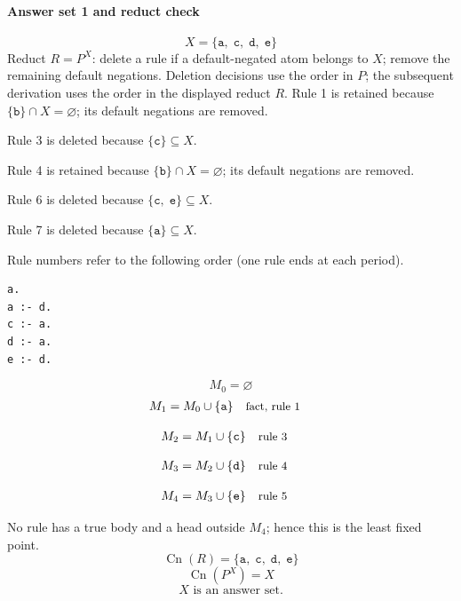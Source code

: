 \documentclass[a4paper,11pt]{article}
\newif\ifexplain
\newcommand{\explain}[1]{\ifexplain\begin{erklbox}#1\end{erklbox}\fi}
\newcommand{\why}[1]{\text{\small #1}}
\newcommand{\at}[1]{\texttt{#1}}
\begin{document}
\paragraph{Answer set 1 and reduct check}
\[
X=\{\at{a},\;\at{c},\;\at{d},\;\at{e}\}
\]
Reduct $R=P^X$: delete a rule if a default-negated atom belongs to $X$; remove the remaining default negations. Deletion decisions use the order in $P$; the subsequent derivation uses the order in the displayed reduct $R$.
Rule 1 is retained because $\{\at{b}\}\cap X=\varnothing$; its default negations are removed.

Rule 3 is deleted because $\{\at{c}\}\subseteq X$.

Rule 4 is retained because $\{\at{b}\}\cap X=\varnothing$; its default negations are removed.

Rule 6 is deleted because $\{\at{c},\;\at{e}\}\subseteq X$.

Rule 7 is deleted because $\{\at{a}\}\subseteq X$.

Rule numbers refer to the following order (one rule ends at each period).
\begin{small}
\begin{verbatim}
a.
a :- d.
c :- a.
d :- a.
e :- d.
\end{verbatim}
\end{small}
\explain{Beim Redukt bleibt die Kandidatenmenge fest. Wir entscheiden zuerst, welche Regeln wegfallen. Erst danach berechnen wir aus den verbleibenden positiven Regeln die kleinste abgeschlossene Menge. Ein Modell allein reicht nicht: Diese Menge muss genau der Kandidat sein.}
\[
M_0=\varnothing
\]
\begin{align*}
M_{1} &= M_{0}\cup \{\at{a}\} && \why{fact, rule 1}
\end{align*}
\explain{Diese Regel hat keinen Körper. Ihr Kopf $\at{a}$ ist damit ein Fakt und muss in die Menge.}
\begin{align*}
M_{2} &= M_{1}\cup \{\at{c}\} && \why{rule 3}
\end{align*}
\explain{Für $\at{c}$ brauchen wir $\at{a}$. Weil diese Voraussetzungen bereits hergeleitet sind, dürfen wir den Regelkopf jetzt aufnehmen und alle bisherigen Atome behalten; bei einer fehlenden Voraussetzung würde diese Regel dagegen noch nichts beitragen.}
\begin{align*}
M_{3} &= M_{2}\cup \{\at{d}\} && \why{rule 4}
\end{align*}
\explain{Für $\at{d}$ brauchen wir $\at{a}$. Weil diese Voraussetzungen bereits hergeleitet sind, dürfen wir den Regelkopf jetzt aufnehmen und alle bisherigen Atome behalten; bei einer fehlenden Voraussetzung würde diese Regel dagegen noch nichts beitragen.}
\begin{align*}
M_{4} &= M_{3}\cup \{\at{e}\} && \why{rule 5}
\end{align*}
\explain{Für $\at{e}$ brauchen wir $\at{d}$. Weil diese Voraussetzungen bereits hergeleitet sind, dürfen wir den Regelkopf jetzt aufnehmen und alle bisherigen Atome behalten; bei einer fehlenden Voraussetzung würde diese Regel dagegen noch nichts beitragen.}
No rule has a true body and a head outside $M_{4}$; hence this is the least fixed point.
\[
\operatorname{Cn}(R)=\{\at{a},\;\at{c},\;\at{d},\;\at{e}\}
\]
\[
\operatorname{Cn}(P^X)=X
\]
\[
\boxed{X\text{ is an answer set.}}
\]
\end{document}
